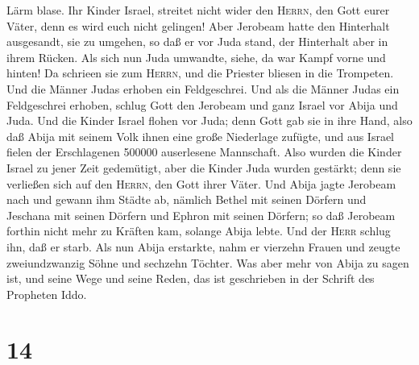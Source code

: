Lärm blase. Ihr Kinder Israel, streitet nicht wider den \textsc{Herrn},
den Gott eurer Väter, denn es wird euch nicht gelingen! 
Aber Jerobeam hatte den Hinterhalt ausgesandt, sie zu umgehen, so daß er
vor Juda stand, der Hinterhalt aber in ihrem Rücken.  Als
sich nun Juda umwandte, siehe, da war Kampf vorne und hinten! Da
schrieen sie zum \textsc{Herrn}, und die Priester bliesen in die
Trompeten.  Und die Männer Judas erhoben ein
Feldgeschrei. Und als die Männer Judas ein Feldgeschrei erhoben, schlug
Gott den Jerobeam und ganz Israel vor Abija und Juda. 
Und die Kinder Israel flohen vor Juda; denn Gott gab sie in ihre Hand,
 also daß Abija mit seinem Volk ihnen eine große
Niederlage zufügte, und aus Israel fielen der Erschlagenen 500000
auserlesene Mannschaft.  Also wurden die Kinder Israel zu
jener Zeit gedemütigt, aber die Kinder Juda wurden gestärkt; denn sie
verließen sich auf den \textsc{Herrn}, den Gott ihrer Väter.
 Und Abija jagte Jerobeam nach und gewann ihm Städte ab,
nämlich Bethel mit seinen Dörfern und Jeschana mit seinen Dörfern und
Ephron mit seinen Dörfern;  so daß Jerobeam forthin nicht
mehr zu Kräften kam, solange Abija lebte. Und der \textsc{Herr} schlug
ihn, daß er starb.  Als nun Abija erstarkte, nahm er
vierzehn Frauen und zeugte zweiundzwanzig Söhne und sechzehn Töchter.
 Was aber mehr von Abija zu sagen ist, und seine Wege und
seine Reden, das ist geschrieben in der Schrift des Propheten Iddo.

\hypertarget{section-13}{%
\section{14}\label{section-13}}

